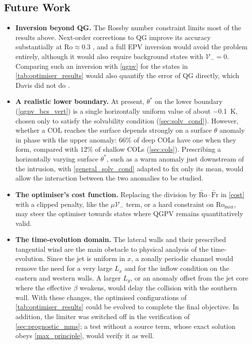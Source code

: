 \documentclass{article}
\begin{document}
\subsection{Future Work}

\begin{itemize}
    \item \textbf{Inversion beyond QG.}
    The Rossby number constraint limits most of the results above.
    Next-order corrections to QG improve its accuracy substantially at $\mathrm{Ro} \approx 0.3$ \cite{Muraki1999}, and a full EPV inversion would avoid the problem entirely, although it would also require background states with $\mathcal{V}_- = 0$.
    Comparing such an inversion with \cref{qgpv} for the states in \cref{tab:optimiser_results} would also quantify the error of QG directly, which Davis did not do \cite{Davis1992jas}.

    \item \textbf{A realistic lower boundary.}
    At present, $\theta^*$ on the lower boundary (\cref{qgpv_bcs_vert}) is a single horizontally uniform value of about \qty{-0.1}{\kelvin}, chosen only to satisfy the solvability condition (\cref{sec:solv_cond}).
    However, whether a COL reaches the surface depends strongly on a surface $\theta$ anomaly in phase with the upper anomaly: 66\% of deep COLs have one when they form, compared with 12\% of shallow COLs \cite{Barnes2021col} (\cref{sec:cols}).
    Prescribing a horizontally varying surface $\theta^*$, such as a warm anomaly just downstream of the intrusion, with \cref{general_solv_cond} adapted to fix only its mean, would allow the interaction between the two anomalies to be studied.

    \item \textbf{The optimiser's cost function.}
    Replacing the division by $\tilde{\mathrm{Ro}} \cdot \tilde{\mathrm{Fr}}$ in \cref{cost} with a clipped penalty, like the $\mu \mathcal{V}_-$ term, or a hard constraint on $\mathrm{Ro}_\text{max}$, may steer the optimiser towards states where QGPV remains quantitatively valid.

    \item \textbf{The time-evolution domain.}
    The lateral walls and their prescribed tangential wind are the main obstacle to physical analysis of the time-evolution.
    Since the jet is uniform in $x$, a zonally periodic channel would remove the need for a very large $L_x$ and for the inflow condition on the eastern and western walls.
    A larger $L_y$, or an anomaly offset from the jet core where the effective $\beta$ weakens, would delay the collision with the southern wall.
    With these changes, the optimised configurations of \cref{tab:optimiser_results} could be evolved to complete the final objective.
    In addition, the limiter was switched off in the verification of \cref{sec:prognostic_mms}; a test without a source term, whose exact solution obeys \cref{max_principle}, would verify it as well.


\end{itemize}
\end{document}
